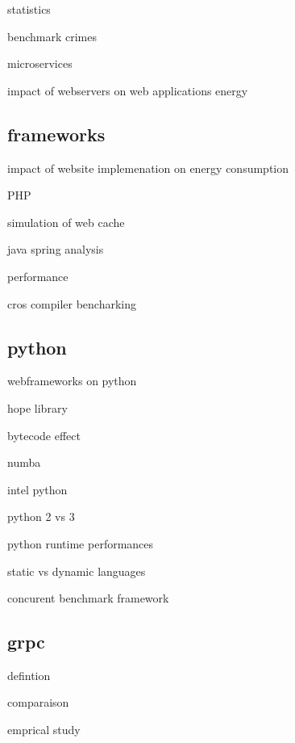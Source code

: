statistics \cite{he_statistics-based_2019}

benchmark crimes \cite{van_der_kouwe_benchmarking_2018}

microservices \cite{grambow_benchmarking_2020}

impact of webservers on web applications energy \cite{manotas_investigating_2013}



\subsection{frameworks}

impact of website implemenation on energy consumption \cite{philippot_characterization_2014} \cite{manotas2013investigating}

PHP \cite{benmoussa_new_2019} \cite{das_comparison_2016}

simulation of web cache \cite{cardenas_performance_2005}

java spring analysis \cite{gajewski_analysis_2019}

performance \cite{mishra2021web}



cros compiler bencharking \cite{yet2016cross}

\subsection{python}

webframeworks on python \cite{pankiv_concurrent_nodate}

hope library \cite{akeret_hope_2015}

bytecode effect \cite{ben_asher_effect_2009}

numba \cite{crist_dask_2016}

intel python \cite{li_boosting_2016}

python 2 vs 3 \cite{modzelewski_pyston_2020}

python runtime performances \cite{redondo_comprehensive_2015} \cite{murri_performance_2013}

static vs dynamic languages \cite{pang_what_nodate}

concurent benchmark framework \cite{pankiv2019concurrent}



\subsection{grpc}

defintion \cite{wang1993grpc}

comparaison \cite{chamas2017comparing}

emprical study \cite{de2021empirical}